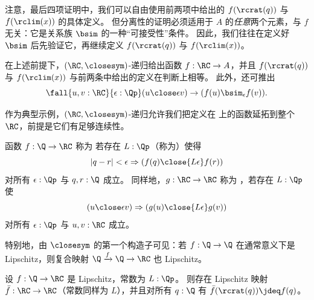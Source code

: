 注意，最后四项证明中，我们可以自由使用前两项中给出的 $f(\rcrat(q))$ 与 $f(\rclim(x))$ 的具体定义。
但分离性的证明必须适用于 $A$ 的\emph{任意}两个元素，与 $f$ 无关：它是关系族 $\bsim$ 的一种“可接受性”条件。
因此，我们往往在定义好 $\bsim$ 后先验证它，再继续定义 $f(\rcrat(q))$ 与 $f(\rclim(x))$。

在上述前提下，$(\RC,\closesym)$-递归给出函数 $f:\RC\to A$，并且 $f(\rcrat(q))$ 与 $f(\rclim(x))$ 与前两条中给出的定义在判断上相等。
此外，还可推出
\begin{equation}
  \fall{u,v:\RC}{\epsilon:\Qp} (u\close\epsilon v) \to (f(u) \bsim_\epsilon f(v)).\label{eq:RC-sim-recursion-extra}
\end{equation}

作为典型示例，$(\RC,\closesym)$-递归允许我们把定义在 \Q 上的函数延拓到整个 $\RC$，前提是它们有足够连续性。
%

\begin{defn}\label{defn:lipschitz}
  函数 $f:\Q\to\RC$ 称为 
  若存在 $L:\Qp$（称为）使得
  \[ |q - r|<\epsilon \Rightarrow (f(q) \close{L\epsilon} f(r)) \]
  对所有 $\epsilon:\Qp$ 与 $q,r:\Q$ 成立。
  同样地，$g:\RC\to\RC$ 称为 ，若存在 $L:\Qp$ 使
  \[ (u\close\epsilon v) \Rightarrow (g(u) \close{L\epsilon} g(v)) \]
  对所有 $\epsilon:\Qp$ 与 $u,v:\RC$ 成立。
\end{defn}

特别地，由 $\closesym$ 的第一个构造子可见：若 $f:\Q\to\Q$ 在通常意义下是 Lipschitz，则复合映射 $\Q\xrightarrow{f} \Q \to \RC$ 也 Lipschitz。

\begin{lem}\label{RC-extend-Q-Lipschitz}
  设 $f : \Q \to \RC$ 是 Lipschitz，常数为 $L : \Qp$。
  则存在 Lipschitz 映射 $\bar{f} : \RC \to \RC$（常数同样为 $L$），并且对所有 $q:\Q$ 有 $\bar{f}(\rcrat(q)) \jdeq f(q)$。
\end{lem}

